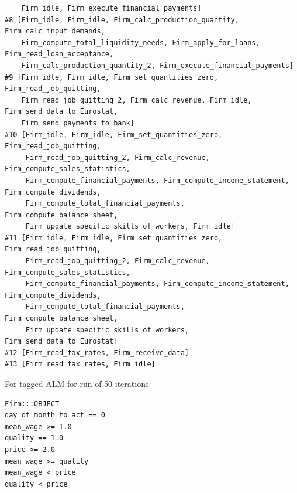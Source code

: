 {\begin{verbatim}
    Firm_idle, Firm_execute_financial_payments]
#8 [Firm_idle, Firm_idle, Firm_calc_production_quantity, Firm_calc_input_demands,
    Firm_compute_total_liquidity_needs, Firm_apply_for_loans, Firm_read_loan_acceptance,
    Firm_calc_production_quantity_2, Firm_execute_financial_payments]
#9 [Firm_idle, Firm_idle, Firm_set_quantities_zero, Firm_read_job_quitting,
    Firm_read_job_quitting_2, Firm_calc_revenue, Firm_idle, Firm_send_data_to_Eurostat,
    Firm_send_payments_to_bank]
#10 [Firm_idle, Firm_idle, Firm_set_quantities_zero, Firm_read_job_quitting,
     Firm_read_job_quitting_2, Firm_calc_revenue, Firm_compute_sales_statistics,
     Firm_compute_financial_payments, Firm_compute_income_statement, Firm_compute_dividends,
     Firm_compute_total_financial_payments, Firm_compute_balance_sheet,
     Firm_update_specific_skills_of_workers, Firm_idle]
#11 [Firm_idle, Firm_idle, Firm_set_quantities_zero, Firm_read_job_quitting,
     Firm_read_job_quitting_2, Firm_calc_revenue, Firm_compute_sales_statistics,
     Firm_compute_financial_payments, Firm_compute_income_statement, Firm_compute_dividends,
     Firm_compute_total_financial_payments, Firm_compute_balance_sheet, 
     Firm_update_specific_skills_of_workers, Firm_send_data_to_Eurostat]
#12 [Firm_read_tax_rates, Firm_receive_data]
#13 [Firm_read_tax_rates, Firm_idle]
\end{verbatim}
}

For tagged ALM for run of 50 iterations:

\begin{verbatim}
Firm:::OBJECT
day_of_month_to_act == 0
mean_wage >= 1.0
quality == 1.0
price >= 2.0
mean_wage >= quality
mean_wage < price
quality < price
\end{verbatim}
